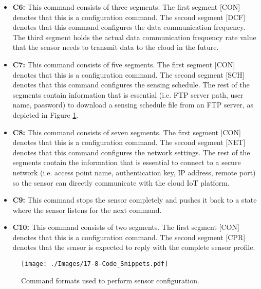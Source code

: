 \documentclass[graybox]{svmult}
\begin{document}
\begin{itemize}
\item \textbf{C6:} This command consists of three segments. The first segment [CON] denotes that this is a configuration command. The second segment [DCF] denotes that this command configures the data communication frequency. The third segment holds the actual data communication frequency rate value that the sensor needs to transmit data to the cloud in the future.



\item \textbf{C7:} This command consists of five segments. The first segment [CON] denotes that this is a configuration command. The second segment [SCH] denotes that this command configures the sensing schedule. The rest of the segments contain information that is essential (i.e. FTP server path, user name, password) to download a sensing schedule file from an FTP server, as depicted in Figure \ref{Figure:Message_Formats}.



\item \textbf{C8:} This command consists of seven segments. The first segment [CON] denotes that this is a configuration command. The second segment [NET] denotes that this command configures the network settings. The rest of the segments contain the information  that is essential to connect to a secure network (i.e. access point name, authentication key, IP address, remote port) so the sensor can directly communicate with the cloud IoT platform.



\item \textbf{C9:} This command stops the sensor completely and pushes it back to a state where the sensor listens for the next command.


\item \textbf{C10:} This command consists of two segments. The first segment [CON] denotes that this is a configuration command. The second segment [CPR] denotes that the sensor is expected to reply with the complete sensor profile.

\end{itemize}


 

\begin{figure}[h]
 \centering
\texttt{[image: ./Images/17-8-Code\_Snippets.pdf]}
\caption{Command formats used to perform sensor configuration.}
 \label{Figure:Message_Formats}
\vspace{-8pt}
\end{figure}
\end{document}
